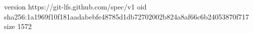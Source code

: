 version https://git-lfs.github.com/spec/v1
oid sha256:1a1969f10f181aadabebfe48785d1db72702002b824a8af66c6b24053870f717
size 1572
